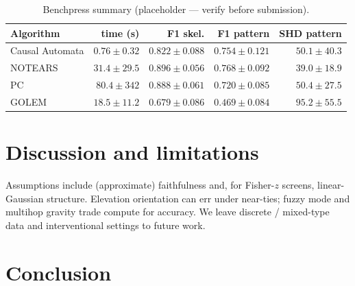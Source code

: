 \documentclass{article}
\begin{document}
\begin{table}[t]
  \centering
  \caption{Benchpress summary (placeholder --- verify before submission).}
  \label{tab:benchpress}
  \begin{tabular}{lrrrr}
    \toprule
    Algorithm & time (s) & F1 skel. & F1 pattern & SHD pattern \\
    \midrule
    Causal Automata & \(0.76\pm0.32\) & \(0.822\pm0.088\) & \(0.754\pm0.121\) & \(50.1\pm40.3\) \\
    NOTEARS         & \(31.4\pm29.5\) & \(0.896\pm0.056\) & \(0.768\pm0.092\) & \(39.0\pm18.9\) \\
    PC              & \(80.4\pm342\)  & \(0.888\pm0.061\) & \(0.720\pm0.085\) & \(50.4\pm27.5\) \\
    GOLEM           & \(18.5\pm11.2\) & \(0.679\pm0.086\) & \(0.469\pm0.084\) & \(95.2\pm55.5\) \\
    \bottomrule
  \end{tabular}
\end{table}


\section{Discussion and limitations}
\label{sec:discussion}


Assumptions include (approximate) faithfulness and, for Fisher-\(z\) screens,
linear-Gaussian structure.
Elevation orientation can err under near-ties; fuzzy mode and multihop gravity
trade compute for accuracy.
We leave discrete / mixed-type data and interventional settings to future work.

\section{Conclusion}
\label{sec:conclusion}
\end{document}
